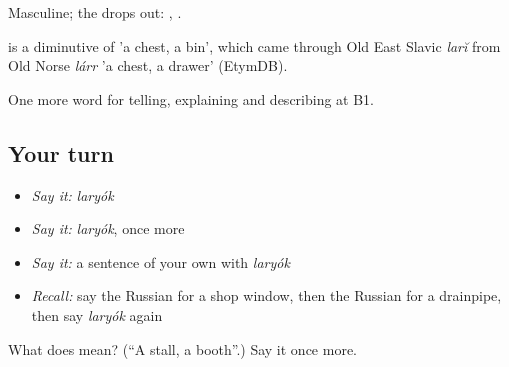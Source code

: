 Masculine; the  drops out: \emph{}, \emph{}.

\begin{cousinweb}
\emph{} is a diminutive of \emph{} 'a chest, a bin', which came through Old East Slavic \emph{larĭ} from Old Norse \emph{lárr} 'a chest, a drawer' (EtymDB).
\end{cousinweb}

\begin{grammarlens}[title={What you've built}]
One more word for telling, explaining and describing at B1.
\end{grammarlens}

\subsection*{Your turn}
\begin{itemize}
\raggedright
  \item \emph{Say it:} \emph{laryók}
  \item \emph{Say it:} \emph{laryók}, once more
  \item \emph{Say it:} a sentence of your own with \emph{laryók}
  \item \emph{Recall:} say the Russian for a shop window, then the Russian for a drainpipe, then say \emph{laryók} again
\end{itemize}

\begin{tcolorbox}[breakable,colback=teal!4,colframe=teal!35!black,title={Before you move on}]
What does  mean? (\textquotedblleft{}A stall, a booth\textquotedblright{}.) Say it once more.
\end{tcolorbox}

